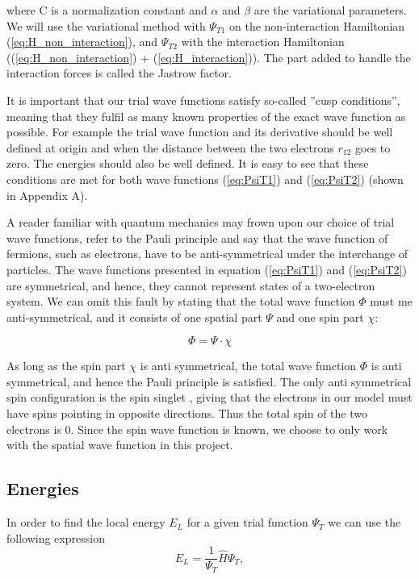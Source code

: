 \documentclass[norsk,a4paper,12pt]{article}
\begin{document}
where C is a normalization constant and $\alpha$ and $\beta$ are the variational parameters. We will use the variational method with $\Psi_{T1}$ on the non-interaction Hamiltonian (\ref{eq:H_non_interaction}), and $\Psi_{T2}$ with the interaction Hamiltonian ((\ref{eq:H_non_interaction}) + (\ref{eq:H_interaction})). The part added to handle the interaction forces is called the Jastrow factor. \cite{MHJ15}

It is important that our trial wave functions satisfy so-called ''cusp conditions'', meaning that they fulfil as many known properties of the exact wave function as possible. For example the trial wave function and its derivative should be well defined at origin and when the distance between the two electrons $r_{12}$ goes to zero. The energies should also be well defined. It is easy to see that these conditions are met for both wave functions (\ref{eq:PsiT1}) and (\ref{eq:PsiT2}) (shown in Appendix A).

A reader familiar with quantum mechanics may frown upon our choice of trial wave functions, refer to the Pauli principle and say that the wave function of fermions, such as electrons, have to be anti-symmetrical under the interchange of particles. The wave functions presented in equation (\ref{eq:PsiT1}) and (\ref{eq:PsiT2}) are symmetrical, and hence, they cannot represent states of a two-electron system. We can omit this fault by stating that the total wave function $\Phi$ must me anti-symmetrical, and it consists of one spatial part $\Psi$ and one spin part $\chi$:

\begin{equation}
    \Phi = \Psi \cdot \chi 
\end{equation}

As long as the spin part $\chi$ is anti symmetrical, the total wave function $\Phi$ is anti symmetrical, and hence the Pauli principle is satisfied. The only anti symmetrical spin configuration is the spin singlet \cite{Griffiths}, giving that the electrons in our model must have spins pointing in opposite directions. Thus the total spin of the two electrons is 0. Since the spin wave function is known, we choose to only work with the spatial wave function in this project.

\subsection{Energies} \label{Energies}
In order to find the local energy $E_L$ for a given trial function $\Psi_T$ we can use the following expression
\begin{equation}
E_L = \frac{1}{\Psi_T}\hat{H}\Psi_T,
\label{eq:localenergy}
\end{equation}
\end{document}
